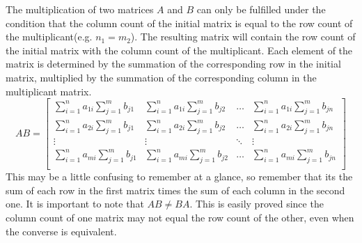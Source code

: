 The multiplication of two matrices $A$ and $B$ can only be fulfilled under the
condition that the column count of the initial matrix is equal to the row count
of the multiplicant(e.g. $n_1 = m_2$). The resulting matrix will contain the row
count of the initial matrix with the column count of the multiplicant. Each
element of the matrix is determined by the summation of the corresponding row in
the initial matrix, multiplied by the summation of the corresponding column in
the multiplicant matrix.
\begin{equation}
    AB = 
    \begin{bmatrix}
        \sum_{i=1}^{n}a_{1i}\sum_{j=1}^{m}b_{j1} 
        & \sum_{i=1}^{n}a_{1i}\sum_{j=1}^{m}b_{j2} 
        & \ldots 
        & \sum_{i=1}^{n}a_{1i}\sum_{j=1}^{m}b_{jn} \\
        \sum_{i=1}^{n}a_{2i}\sum_{j=1}^{m}b_{j1} 
        & \sum_{i=1}^{n}a_{2i}\sum_{j=1}^{m}b_{j2} 
        & \ldots 
        & \sum_{i=1}^{n}a_{2i}\sum_{j=1}^{m}b_{jn} \\
        \vdots & \vdots & \ddots & \vdots \\
        \sum_{i=1}^{n}a_{mi}\sum_{j=1}^{m}b_{j1} 
        & \sum_{i=1}^{n}a_{mi}\sum_{j=1}^{m}b_{j2} 
        & \ldots 
        & \sum_{i=1}^{n}a_{mi}\sum_{j=1}^{m}b_{jn} \\
    \end{bmatrix}
\end{equation}
This may be a little confusing to remember at a glance, so remember that its the
sum of each row in the first matrix times the sum of each column in the second
one. It is important to note that $AB \neq BA$. This is easily proved since the 
column count of one matrix may not equal the row count of the other, even when
the converse is equivalent.

